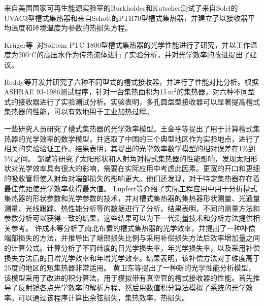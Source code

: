 来自美国国家可再生能源实验室的Burkholder和Kutscher\cite{Burkholder2009}测试了来自Solel的UVAC3型槽式集热器和来自Schott的PTR70型槽式集热器，并建立了以接收器平均温度和环境温度为参数的热损失方程。

Kr\"uger等~\cite{Kruger2008}对Solitem PTC 1800型槽式集热器的光学性能进行了研究，并以工作温度为200$^\circ\mathrm{C}$的高压水作为传热流体进行了实验分析，并对光学效率的改进提出了建议。

Reddy等\cite{Reddy2015b}开发并研究了六种不同型式的槽式接收器，并进行了性能对比分析。根据ASHRAE 93-1986测试程序，针对一台集热面积为15$\,\mathrm{m^2}$的集热器，对六种不同型式的接收器进行了实验测试分析。实验表明，多孔圆盘型接收器可以显著提高槽式集热器的性能，可以有效地用于工业加热过程。


一些研究人员研究了槽式集热器的光学效率模型。王金平等\cite{Wang2016}提出了用于计算槽式集热器的光学效率的数学模型，并选取了中国的三个典型地区作为实验地点，进行了相关的实验验证工作。结果表明，其提出的光学效率数学模型的相对误差在1\%到5\%之间。
邹斌等\cite{Zou2017}研究了太阳形状和入射角对槽式集热器的性能影响，发现太阳形状对光学效率具有很大的影响，需要在实际应用中考虑此因素。更宽的开口和更细的吸收管将使入射角对端部损失的影响更大。他们还发现，对于特定集热器存在着最佳焦距使光学效率获得最大值。
L\"upfert等\cite{Lupfert2006}介绍了实际工程应用中用于分析槽式集热器的形状参数和光学参数的技术，并对槽式集热器的集热器形状测量、光通量测量、光线跟踪、热性能分析等的数据进行了分析。结果表明，不同的测量方法和参数分析可以获得一致的结果，这些结果可以为下一代测量技术和分析方法提供相关参考。
许成木等\cite{Xu2014}分析了南北布置的槽式集热器的光学效率，并提出了一种补偿端部损失的方法，并推导出了端部损失比例与采用补偿损失方法后效率增加量之间的计算公式。计算分析了不同纬度的日光学损失率，年光学损失率，以及采用补偿损失方法后的日增光学效率和年增光学效率。结果表明，该补偿方法对于维度高于25度的地区的短集热器非常适用。
黄卫东等\cite{Huang2012}提出了一种新的光学性能分析模型，该模型采用了改进的积分算法，用于模拟带有真空管的槽式接收器的性能。首先推导了反射镜各点光学效率的解析方程，然后用数值积分算法模拟了系统的光学效率。可以通过该程序计算出余弦损失，集热效率，热损失。

